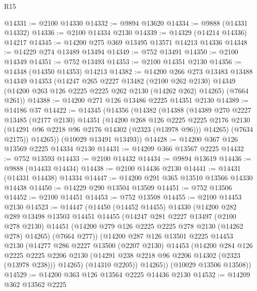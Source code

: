 \begin{lexlean}{R15}
\begin{coremodule}
@14331 := @2100 @14330
@14332 := @9894 @13620
@14334 := @9888 (@14331 @14332)
@14336 := @2100 @14334 @2130
@14339 := @14329 (@14214 @14336) @14217
@14345 := @14200 @275 @369 @13495 @13571 @14213 @14336
@14348 := @14229 @274 @13489 @13494
@14349 := @752 @13491
@14350 := @2100 @14349
@14351 := @752 @13493
@14353 := @2100 @14351 @2130
@14356 := @14348 (@14350 @14353) @14213
@14382 := @14200
    @266
    @273
    @13483
    @13488
    @14349
    @14353
    (@14247
      @265
      @2227
      @13482
      (@2100 @262 @2130)
      @14349
      (@14200 @263 @126 @2225 @2225 @262 @2130 (@14262 @262) @14265)
      (@7664 @261))
@14388 := @14200 @271 @126 @13486 @2225 @14351 @2130
@14389 := @14186 @37
@14422 := @14345
    (@14356
      (@14382
        (@14388
          (@14389
            @270
            @2227
            @13485
            (@2177 @2130)
            @14351
            (@14200
              @268
              @126
              @2225
              @2225
              @2176
              @2130
              (@14291 @96 @2218 @96 @2176 @14302 (@2323 (@13978 @96)))
              @14265)
            (@7634 @2175))
          @14265))
      (@10029 @13491 @13493))
@14428 := @14200 @367 @126 @13569 @2225 @14334 @2130
@14431 := @14209 @366 @13567 @2225
@14432 := @752 @13593
@14433 := @2100 @14432
@14434 := @9894 @13619
@14436 := @9888 (@14433 @14434)
@14438 := @2100 @14436 @2130
@14441 := @14431 (@14331 @14438) @14334
@14447 := @14200 @291 @365 @13510 @13566 @14330 @14438
@14450 := @14229 @290 @13504 @13509
@14451 := @752 @13506
@14452 := @2100 @14451
@14453 := @752 @13508
@14455 := @2100 @14453 @2130
@14523 := @14447
    (@14450
      (@14452 @14455)
      @14330
      (@14200
        @282
        @289
        @13498
        @13503
        @14451
        @14455
        (@14247
          @281
          @2227
          @13497
          (@2100 @278 @2130)
          @14451
          (@14200 @279 @126 @2225 @2225 @278 @2130 (@14262 @278) @14265)
          (@7664 @277))
        (@14200
          @287
          @126
          @13501
          @2225
          @14453
          @2130
          (@14277
            @286
            @2227
            @13500
            (@2207 @2130)
            @14453
            (@14200
              @284
              @126
              @2225
              @2225
              @2206
              @2130
              (@14291 @238 @2218 @96 @2206 @14302 (@2323 (@13978 @238)))
              @14265)
            (@14310 @2205))
          @14265))
      (@10029 @13506 @13508))
@14529 := @14200 @363 @126 @13564 @2225 @14436 @2130
@14532 := @14209 @362 @13562 @2225

\end{coremodule}
\end{lexlean}
